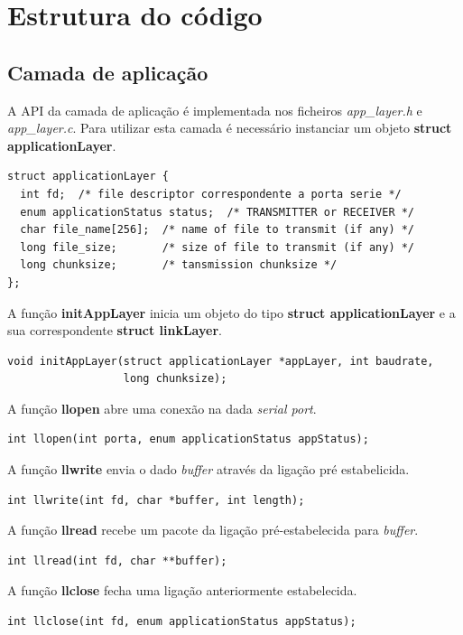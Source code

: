 \documentclass[11pt]{report}
\begin{document}
{\let\clearpage\relax \chapter{Estrutura do código}}

\section{Camada de aplicação}

A API da camada de aplicação é implementada nos ficheiros \textit{app\_layer.h}
e \textit{app\_layer.c}. Para utilizar esta camada é necessário instanciar um objeto
\textbf{struct applicationLayer}.

\begin{lstlisting}
struct applicationLayer {
  int fd;  /* file descriptor correspondente a porta serie */
  enum applicationStatus status;  /* TRANSMITTER or RECEIVER */
  char file_name[256];  /* name of file to transmit (if any) */
  long file_size;       /* size of file to transmit (if any) */
  long chunksize;       /* tansmission chunksize */
};
\end{lstlisting}

A função \textbf{initAppLayer} inicia um objeto do tipo \textbf{struct applicationLayer}
e a sua correspondente \textbf{struct linkLayer}.
\begin{lstlisting}
void initAppLayer(struct applicationLayer *appLayer, int baudrate,
                  long chunksize);
\end{lstlisting}

A função \textbf{llopen} abre uma conexão na dada \textit{serial port}.
\begin{lstlisting}
int llopen(int porta, enum applicationStatus appStatus);
\end{lstlisting}

A função \textbf{llwrite} envia o dado \textit{buffer} através da ligação pré estabelicida.
\begin{lstlisting}
int llwrite(int fd, char *buffer, int length);
\end{lstlisting}

A função \textbf{llread} recebe um pacote da ligação pré-estabelecida para \textit{buffer}.
\begin{lstlisting}
int llread(int fd, char **buffer);
\end{lstlisting}

A função \textbf{llclose} fecha uma ligação anteriormente estabelecida.
\begin{lstlisting}
int llclose(int fd, enum applicationStatus appStatus);
\end{lstlisting}
\end{document}
